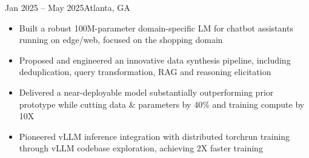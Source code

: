     {}
    {Jan 2025 -- May 2025}{Atlanta, GA}{}
\begin{itemize}
    \item Built a robust 100M-parameter domain-specific LM for chatbot assistants running on edge/web, 
    focused on the shopping domain

    \item Proposed and engineered an innovative data synthesis pipeline,
    including deduplication, query transformation, RAG and reasoning elicitation


    \item Delivered a near-deployable model substantially
    outperforming prior prototype
    while cutting data \& parameters by 40\% and training compute by 10X

    \item Pioneered vLLM inference integration with distributed torchrun training
    through vLLM codebase exploration,
    achieving 2X faster training



\end{itemize}
